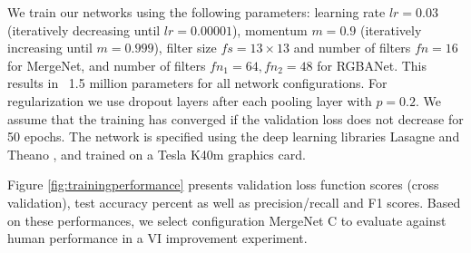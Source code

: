 We train our networks using the following parameters: learning rate $lr=0.03$ (iteratively decreasing until $lr=0.00001$), momentum $m=0.9$ (iteratively increasing until $m=0.999$), filter size $fs=13\times13$ and number of filters $fn=16$ for MergeNet, and number of filters $fn_1=64, fn_2=48$ for RGBANet. This results in ~1.5 million parameters for all network configurations. For regularization we use dropout layers after each pooling layer with $p=0.2$. We assume that the training has converged if the validation loss does not decrease for 50 epochs. The network is specified using the deep learning libraries Lasagne and Theano \cite{Bastien-Theano-2012}, and trained on a Tesla K40m graphics card.

Figure \ref{fig:trainingperformance} presents validation loss function scores (cross validation), test accuracy percent as well as precision/recall and F1 scores. Based on these performances, we select configuration MergeNet C to evaluate against human performance in a VI improvement experiment.











